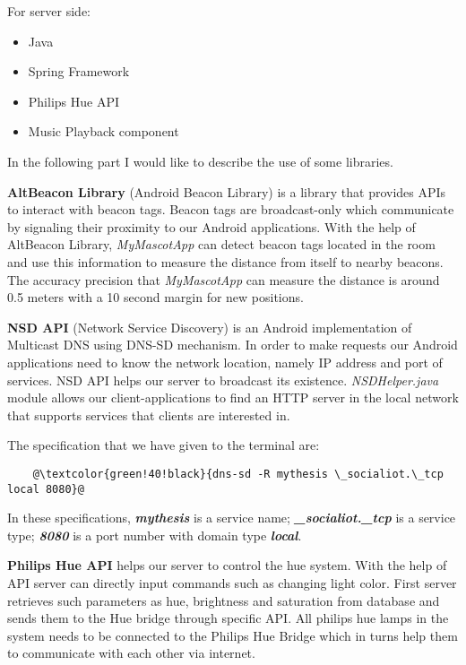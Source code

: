 For server side:
\begin{itemize}
    \item Java
    \item Spring Framework
    \item Philips Hue API
    \item Music Playback component
\end{itemize}

In the following part I would like to describe the use of some libraries.

\textbf{AltBeacon Library} (Android Beacon Library) is a library that provides APIs to interact with beacon tags.
Beacon tags are broadcast-only which communicate by signaling their proximity to our Android applications.
With the help of AltBeacon Library, \emph{MyMascotApp} can detect beacon tags located in the room
and use this information to measure the distance from itself to nearby beacons.
The accuracy precision that \emph{MyMascotApp} can measure the distance is around 0.5 meters
with a 10 second margin for new positions.

\textbf{NSD API} (Network Service Discovery) is an Android implementation of Multicast DNS using DNS-SD mechanism.
In order to make requests our Android applications need to know the network location,
namely IP address and port of services.
NSD API helps our server to broadcast its existence.
\emph{NSDHelper.java} module allows our client-applications to find an HTTP server in the local network that supports
services that clients are interested in.

The specification that we have given to the terminal are:
\begin{lstlisting}
    @\textcolor{green!40!black}{dns-sd -R mythesis \_socialiot.\_tcp local 8080}@
\end{lstlisting}
In these specifications, \textbf{\emph{mythesis}} is a service name;
\textbf{\emph{\_socialiot.\_tcp}} is a service type;
\textbf{\emph{8080}} is a port number with domain type \textbf{\emph{local}}.

\textbf{Philips Hue API} helps our server to control the hue system.
With the help of API server can directly input commands such as changing light color.
First server retrieves such parameters as hue, brightness and saturation from database and sends them
to the Hue bridge through specific API\@.
All philips hue lamps in the system needs to be connected to the Philips Hue Bridge which in turns help them
to communicate with each other via internet.

